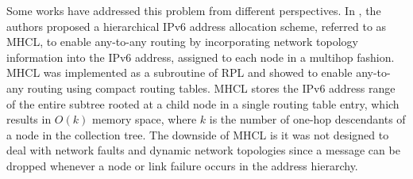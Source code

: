 Some works have addressed this problem from different perspectives.
In \cite{2016techreport}, the authors proposed a hierarchical IPv6 address
allocation scheme, referred to as MHCL, to enable any-to-any routing
by incorporating network topology information into the IPv6 address,
assigned to each node in a multihop fashion. MHCL was implemented as
a subroutine of RPL and showed to enable any-to-any routing using
compact routing tables. MHCL stores the IPv6 address range of the
entire subtree rooted at a child node in a single routing table
entry, which results in $O(k)$ memory space, where $k$ is the number
of one-hop descendants of a node in the collection tree. The
downside of MHCL is it was not designed to deal with network faults
and dynamic network topologies since a message can be dropped
whenever a node or link failure occurs in the address hierarchy.

